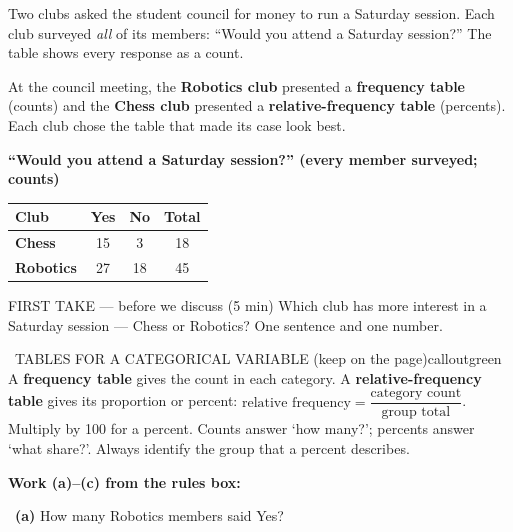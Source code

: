 \documentclass[11pt]{article}
\begin{document}


Two clubs asked the student council for money to run a Saturday session. Each club surveyed \emph{all} of its members: ``Would you attend a Saturday session?'' The table shows every response as a count.\par\smallskip At the council meeting, the \textbf{Robotics club} presented a \textbf{frequency table} (counts) and the \textbf{Chess club} presented a \textbf{relative-frequency table} (percents). Each club chose the table that made its case look best.\par
\begin{center}
\textbf{``Would you attend a Saturday session?'' (every member surveyed; counts)}\par\smallskip
\begin{tabular}{|l|c|c|c|}
\hline
\textbf{Club} & \textbf{Yes} & \textbf{No} & \textbf{Total} \\ \hline
\textbf{Chess} & 15 & 3 & 18 \\ \hline
\textbf{Robotics} & 27 & 18 & 45 \\ \hline
\end{tabular}
\end{center}
\begin{firsttakebox}{FIRST TAKE --- before we discuss (5 min)}
Which club has more interest in a Saturday session --- Chess or Robotics? One sentence and one number.
\workspace{0.9in}
\end{firsttakebox}

\begin{callout}{\IconBook\ TABLES FOR A CATEGORICAL VARIABLE (keep on the page)}{calloutgreen}
A \textbf{frequency table} gives the count in each category. A \textbf{relative-frequency table} gives its proportion or percent: $\text{relative frequency}=\dfrac{\text{category count}}{\text{group total}}$. Multiply by 100 for a percent. Counts answer `how many?'; percents answer `what share?'. Always identify the group that a percent describes.
\end{callout}

\newpage
\textbf{Work (a)--(c) from the rules box:}\par\smallskip

~\textbf{(a)} How many Robotics members said Yes?\par
\workspace{0.8in}
\end{document}

